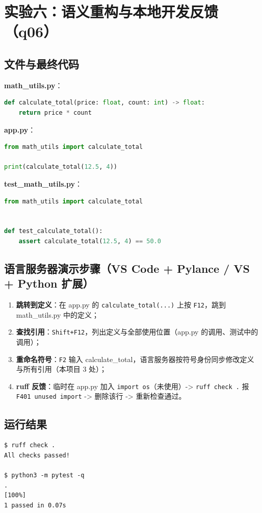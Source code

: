 \documentclass[UTF8,fontset=ubuntu]{ctexart}
\begin{document}
\section{实验六：语义重构与本地开发反馈（q06）}

\subsection{文件与最终代码}
\textbf{math\_utils.py}：
\begin{lstlisting}[language=Python]
def calculate_total(price: float, count: int) -> float:
    return price * count
\end{lstlisting}

\textbf{app.py}：
\begin{lstlisting}[language=Python]
from math_utils import calculate_total

print(calculate_total(12.5, 4))
\end{lstlisting}

\textbf{test\_math\_utils.py}：
\begin{lstlisting}[language=Python]
from math_utils import calculate_total


def test_calculate_total():
    assert calculate_total(12.5, 4) == 50.0
\end{lstlisting}

\subsection{语言服务器演示步骤（VS Code + Pylance / VS + Python 扩展）}
\begin{enumerate}
\item \textbf{跳转到定义}：在 app.py 的 \lstinline|calculate_total(...)| 上按 \lstinline|F12|，跳到 math\_utils.py 中的定义；
\item \textbf{查找引用}：\lstinline|Shift+F12|，列出定义与全部使用位置（app.py 的调用、测试中的调用）；
\item \textbf{重命名符号}：\lstinline|F2| 输入 calculate\_total，语言服务器按符号身份同步修改定义与所有引用（本项目 3 处）；
\item \textbf{ruff 反馈}：临时在 app.py 加入 \lstinline|import os|（未使用）-> \lstinline|ruff check .| 报 \lstinline|F401 unused import| -> 删除该行 -> 重新检查通过。
\end{enumerate}

\subsection{运行结果}
\begin{lstlisting}
$ ruff check .
All checks passed!

$ python3 -m pytest -q
.                                                                        [100%]
1 passed in 0.07s
\end{lstlisting}
\end{document}
